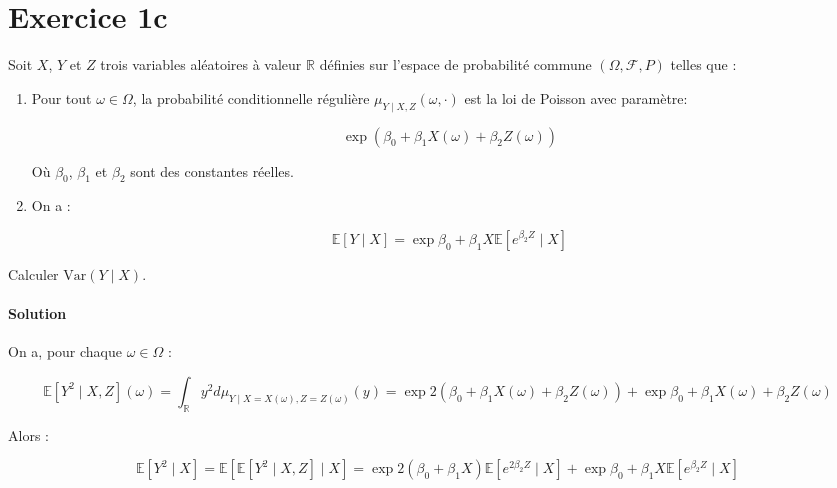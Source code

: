 \documentclass[../main.tex]{subfiles}
\begin{document}
\section*{Exercice 1c}
\begin{CJK*}{UTF8}{gbsn}
Soit $X$, $Y$ et $Z$ trois variables aléatoires à valeur $\mathbb{R}$ définies sur
l'espace de probabilité commune $(\Omega, \mathcal{F}, P)$ telles que :

\begin{enumerate}
    \item Pour tout $\omega \in \Omega$, la probabilité conditionnelle régulière $\mu_{Y \mid X, Z}(\omega, \cdot)$ 
    est la loi de Poisson avec paramètre:

    \begin{equation*}
        \exp(\beta_0 + \beta_1 X(\omega) + \beta_2 Z(\omega))
    \end{equation*} 

    Où $\beta_0$, $\beta_1$ et $\beta_2$ sont des constantes réelles.

    \item On a :
    
    \begin{equation*}
        \mathbb{E}[Y \mid X] = \exp{\beta_0+\beta_1 X} \mathbb{E}[e^{\beta_2 Z} \mid X]
    \end{equation*}
\end{enumerate}

Calculer $\text{Var}(Y \mid X)$.

\smallskip
\paragraph{Solution}
On a, pour chaque $\omega \in \Omega$ :

\begin{equation*}
    \mathbb{E}[Y^2 \mid X, Z](\omega) = \int_{\mathbb{R}} y^2 d \mu_{Y \mid X = X(\omega), Z = Z(\omega)} (y) = 
    \exp{2(\beta_0 + \beta_1X(\omega) + \beta_2Z(\omega))}  + \exp{\beta_0 + \beta_1X(\omega) + \beta_2Z(\omega)}
\end{equation*}

Alors :

\begin{equation*}
    \mathbb{E}[Y^2 \mid X] = \mathbb{E}[\mathbb{E}[Y^2 \mid X, Z] \mid X] = 
    \exp{2(\beta_0+\beta_1X)}\mathbb{E}[e^{2 \beta_2 Z} \mid X] + \exp{\beta_0 + \beta_1 X} \mathbb{E}[e^{\beta_2Z} \mid X]
\end{equation*}


\end{CJK*}
\end{document}

